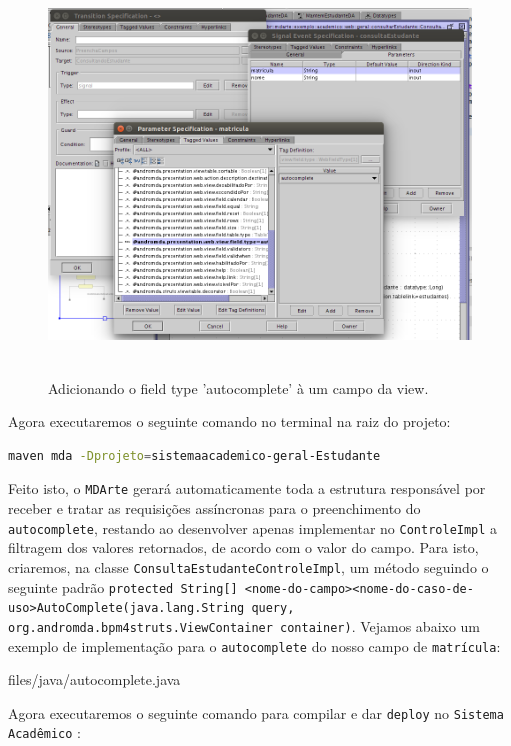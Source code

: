 \begin{figure}[H]
	\centering
	\includegraphics[width=350pt,height=300pt]{files/imgs/tutorial-mdarte-0027.png}
	\caption{Adicionando o field type 'autocomplete' à um campo da view.}
	\label{field_type_autocomplete}
\end{figure}

Agora executaremos o seguinte comando no terminal na raiz do projeto:
\begin{lstlisting}[language=bash]
maven mda -Dprojeto=sistemaacademico-geral-Estudante
\end{lstlisting}

Feito isto, o \texttt{MDArte} gerará automaticamente toda a estrutura
responsável por receber e tratar as requisições assíncronas para o preenchimento do
\texttt{autocomplete}, restando ao desenvolver apenas implementar no
\texttt{ControleImpl} a filtragem dos valores retornados, de acordo com o valor
do campo. Para isto, criaremos, na classe
\texttt{ConsultaEstudanteControleImpl}, um método seguindo o seguinte padrão 
\texttt{protected String[]
<nome-do-campo><nome-do-caso-de-uso>AutoComplete(java.lang.String query,
org.andromda.bpm4struts.ViewContainer container)}. Vejamos abaixo um exemplo de
implementação para o \texttt{autocomplete} do nosso campo de \texttt{matrícula}:

 {files/java/autocomplete.java}

Agora executaremos o seguinte comando para compilar e dar \texttt{deploy} no
\texttt{Sistema Acadêmico} :

